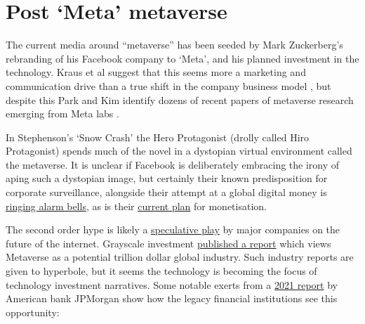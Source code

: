 \section{Post `Meta' metaverse}
The current media around ``metaverse'' has been seeded by Mark Zuckerberg's rebranding of his Facebook company to `Meta', and his planned investment in the technology. Kraus et al suggest that this seems more a marketing and communication drive than a true shift in the company business model \cite{kraus2022facebook}, but despite this Park and Kim identify dozens of recent papers of metaverse research emerging from Meta labs \cite{park2022metaverse}. \par
In Stephenson's `Snow Crash' the Hero Protagonist (drolly called Hiro Protagonist) spends much of the novel in a dystopian virtual environment called the metaverse. It is unclear if Facebook is deliberately embracing the irony of aping such a dystopian image, but certainly their known predisposition for corporate surveillance, alongside their attempt at a global digital money is \href{https://www.politico.com/newsletters/digital-future-daily/2022/04/12/the-facebook-whistleblower-takes-on-the-metaverse-00024762}{ringing alarm bells}, as is their \href{https://www.cnet.com/personal-finance/metas-new-47-5-fee-on-metaverse-items-has-nft-twitter-pissed/}{current plan} for monetisation.\par
The second order hype is likely a \href{https://www.goldmansachs.com/insights/pages/framing-the-future-of-web-3.0-metaverse-edition.html}{speculative play} by major companies on the future of the internet. Grayscale investment \href{https://grayscale.com/wp-content/uploads/2021/11/Grayscale_Metaverse_Report_Nov2021.pdf}{published a report} which views Metaverse as a potential trillion dollar global industry. Such industry reports are given to hyperbole, but it seems the technology is becoming the focus of technology investment narratives. Some notable exerts from a \href{https://www.jpmorgan.com/content/dam/jpm/treasury-services/documents/opportunities-in-the-metaverse.pdf}{2021 report} by American bank JPMorgan show how the legacy financial institutions see this opportunity:\par
